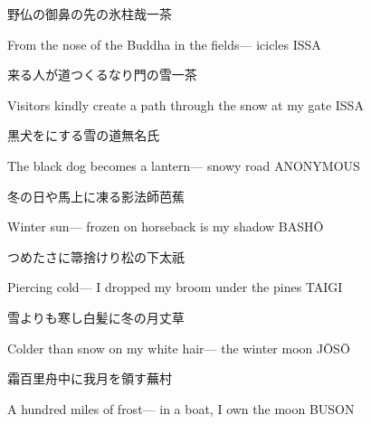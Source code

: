 \begin{haiku}
    {\FH 野仏の御鼻の先の氷柱哉}\hfill{\FH 一茶}

    \vin{} From the nose
    \vin{} \vin{} of the Buddha in the fields---
    \vin{} \vin{} \vin{} icicles \hspace{\fill} ISSA
\end{haiku}

\begin{haiku}
    {\FH 来る人が道つくるなり門の雪}\hfill{\FH 一茶}

    \vin{} Visitors
    \vin{} \vin{} kindly create a path
    \vin{} \vin{} \vin{} through the snow at my gate \hspace{\fill} ISSA
\end{haiku}

\begin{haiku}
    {\FH 黒犬をにする雪の道}\hfill{\FH 無名氏}

    \vin{} The black dog
    \vin{} \vin{} becomes a lantern---
    \vin{} \vin{} \vin{} snowy road \hspace{\fill} ANONYMOUS
\end{haiku}

\begin{haiku}
    {\FH 冬の日や馬上に凍る影法師}\hfill{\FH 芭蕉}

    \vin{} Winter sun---
    \vin{} \vin{} frozen on horseback
    \vin{} \vin{} \vin{} is my shadow \hspace{\fill} BASH\={O}
\end{haiku}

\begin{haiku}
    {\FH つめたさに箒捨けり松の下}\hfill{\FH 太祇}

    \vin{} Piercing cold---
    \vin{} \vin{} I dropped my broom
    \vin{} \vin{} \vin{} under the pines \hspace{\fill} TAIGI
\end{haiku}

\begin{haiku}
    {\FH 雪よりも寒し白髪に冬の月}\hfill{\FH 丈草}

    \vin{} Colder than snow
    \vin{} \vin{} on my white hair---
    \vin{} \vin{} \vin{} the winter moon \hspace{\fill} J\={O}S\={O}
\end{haiku}

\begin{haiku}
    {\FH 霜百里舟中に我月を領す}\hfill{\FH 蕪村}

    \vin{} A hundred miles of frost---
    \vin{} \vin{} in a boat, I own
    \vin{} \vin{} \vin{} the moon \hspace{\fill} BUSON
\end{haiku}

